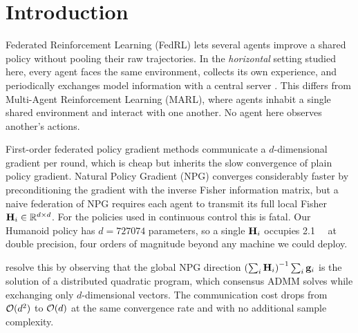 \section{Introduction}
\label{sec:introduction}

Federated Reinforcement Learning (FedRL) lets several agents improve a shared
policy without pooling their raw trajectories. In the \emph{horizontal}
setting studied here, every agent faces the same environment, collects its own
experience, and periodically exchanges model information with a central server
\citep{qi2021fedrlsurvey}. This differs from Multi-Agent Reinforcement Learning (MARL), where agents
inhabit a single shared environment and interact with one another. No agent
here observes another's actions.

First-order federated policy gradient methods communicate a $d$-dimensional
gradient per round, which is cheap but inherits the slow convergence of plain
policy gradient. Natural Policy Gradient (NPG) converges considerably faster
by preconditioning the gradient with the inverse Fisher information matrix,
but a naive federation of NPG requires each agent to transmit its full local
Fisher $\mathbf{H}_i \in \mathbb{R}^{d \times d}$. For the policies used in continuous
control this is fatal. Our Humanoid policy has $d = \num{727074}$ parameters,
so a single $\mathbf{H}_i$ occupies \SI{2.1}{\peta\byte} at double precision, four
orders of magnitude beyond any machine we could deploy.

\citet{lan2023fednpgadmm} resolve this by observing that the global NPG direction
$\left(\sum_i \mathbf{H}_i\right)^{-1}\sum_i \mathbf{g}_i$ is the solution of a distributed
quadratic program, which consensus ADMM solves while exchanging only
$d$-dimensional vectors. The communication cost drops from $\mathcal{O}(d^2)$ to
$\mathcal{O}(d)$ at the same convergence rate and with no additional sample
complexity.

